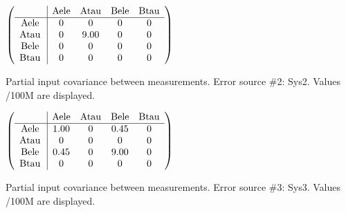 \begin{table}[H]
\scriptsize
\begin{center}
\renewcommand{\arraystretch}{1.1}
\begin{math}\left(\begin{array}{c|cccc}
 & \mathrm{Aele} & 
\mathrm{Atau} & 
\mathrm{Bele} & 
\mathrm{Btau} \\
\hline
\mathrm{Aele} \hspace*{2pt} &  0 &  0 &  0 &  0 \\
\mathrm{Atau} \hspace*{2pt} &  0 &       9.00 &  0 &  0 \\
\mathrm{Bele} \hspace*{2pt} &  0 &  0 &  0 &  0 \\
\mathrm{Btau} \hspace*{2pt} &  0 &  0 &  0 &  0 \\
\end{array}\right)\end{math}
\caption{Partial input covariance between measurements. Error source \#2: Sys2. Values /100M are displayed.}
\renewcommand{\arraystretch}{1}
\end{center}
\end{table}
\begin{table}[H]
\scriptsize
\begin{center}
\renewcommand{\arraystretch}{1.1}
\begin{math}\left(\begin{array}{c|cccc}
 & \mathrm{Aele} & 
\mathrm{Atau} & 
\mathrm{Bele} & 
\mathrm{Btau} \\
\hline
\mathrm{Aele} \hspace*{2pt} &       1.00 &  0 &       0.45 &  0 \\
\mathrm{Atau} \hspace*{2pt} &  0 &  0 &  0 &  0 \\
\mathrm{Bele} \hspace*{2pt} &       0.45 &  0 &       9.00 &  0 \\
\mathrm{Btau} \hspace*{2pt} &  0 &  0 &  0 &  0 \\
\end{array}\right)\end{math}
\caption{Partial input covariance between measurements. Error source \#3: Sys3. Values /100M are displayed.}
\renewcommand{\arraystretch}{1}
\end{center}
\end{table}

